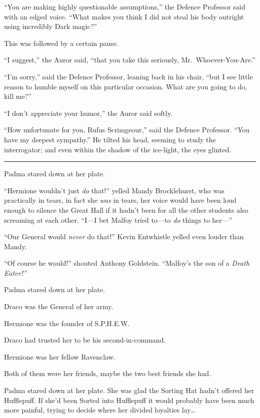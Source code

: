 ``You are making highly questionable assumptions,'' the Defence
Professor said with an edged voice. ``What makes you think I did not
steal his body outright using incredibly Dark magic?''

This was followed by a certain pause.

``I suggest,'' the Auror said, ``that you take this seriously,
Mr.~Whoever-You-Are.''

``I'm sorry,'' said the Defence Professor, leaning back in his chair,
``but I see little reason to humble myself on this particular occasion.
What are you going to do, kill me?''

``I don't appreciate your humor,'' the Auror said softly.

``How unfortunate for you, Rufus Scrimgeour,'' said the Defence
Professor. ``You have my deepest sympathy.'' He tilted his head, seeming
to study the interrogator; and even within the shadow of the ice-light,
the eyes glinted.

\begin{center}\rule{3in}{0.4pt}\end{center}

Padma stared down at her plate.

``Hermione wouldn't just \emph{do} that!'' yelled Mandy Brocklehurst,
who was practically in tears, in fact she \emph{was} in tears, her voice
would have been loud enough to silence the Great Hall if it hadn't been
for all the other students also screaming at each other. ``I---I bet
Malfoy tried to---to \emph{do} things to her---''

``Our General would \emph{never} do that!'' Kevin Entwhistle yelled even
louder than Mandy.

``Of course he would!'' shouted Anthony Goldstein. ``Malfoy's the son of
a \emph{Death Eater!''}

Padma stared down at her plate.

Draco was the General of her army.

Hermione was the founder of S.P.H.E.W.

Draco had trusted her to be his second-in-command.

Hermione was her fellow Ravenclaw.

Both of them were her friends, maybe the two best friends she had.

Padma stared down at her plate. She was glad the Sorting Hat hadn't
offered her Hufflepuff. If she'd been Sorted into Hufflepuff it would
probably have been much more painful, trying to decide where her divided
loyalties lay\ldots{}

